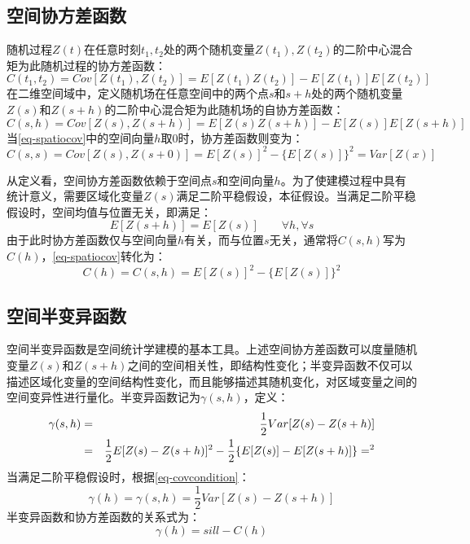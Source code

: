 \subsection{空间协方差函数}
随机过程$Z(t)$在任意时刻$t_1,t_2$处的两个随机变量$Z(t_1),Z(t_2)$的二阶中心混合矩为此随机过程的协方差函数：
\begin{equation}
    C(t_1,t_2) = Cov\left[ Z(t_1),Z(t_2) \right] = E\left[ Z(t_1)Z(t_2) \right] - E\left[ Z(t_1) \right] E\left[ Z(t_2) \right]
    \label{eq-temporalcov}
\end{equation}
在二维空间域中，定义随机场在任意空间中的两个点$s$和$s+h$处的两个随机变量$Z(s)$和$Z(s+h)$的二阶中心混合矩为此随机场的自协方差函数：
\begin{equation}
    C(s,h) = Cov\left[ Z(s),Z(s+h) \right] = E\left[ Z(s)Z(s+h) \right]-E\left[ Z(s) \right] E\left[ Z(s+h) \right]
    \label{eq-spatiocov}
\end{equation}
当\cref{eq-spatiocov}中的空间向量$h$取0时，协方差函数则变为：
\begin{equation}
    C(s,s) = Cov\left[ Z(s), Z(s+0) \right] = E\left[ Z(s) \right]^2 - \{ E\left[ Z(s) \right] \}^2 = Var\left[ Z(x) \right]
    \label{eq-spatiocovsimplize}
\end{equation}

从定义看，空间协方差函数依赖于空间点$s$和空间向量$h$。为了使建模过程中具有统计意义，需要区域化变量$Z(s)$满足二阶平稳假设，本征假设。当满足二阶平稳假设时，空间均值与位置无关，即满足：
\begin{equation}
    E[Z(s+h)] = E[Z(s)] \qquad \forall h,\forall s
    \label{eq-covcondition}
\end{equation}
由于此时协方差函数仅与空间向量$h$有关，而与位置$s$无关，通常将$C(s,h)$写为$C(h)$，\cref{eq-spatiocov}转化为：
\begin{equation}
    C(h)=C(s,h) = E[Z(s)]^2 - \{ E[Z(s)] \}^2
    \label{eq-conditionalcov}
\end{equation}

\subsection{空间半变异函数}
空间半变异函数是空间统计学建模的基本工具。上述\textcolor[rgb]{1,0,0}{空间协方差函数可以度量随机变量$Z(s)$和$Z(s+h)$之间的空间相关性，即结构性变化}；半变异函数不仅可以描述区域化变量的空间结构性变化，而且能够描述其随机变化，对区域变量之间的空间变异性进行量化。半变异函数记为$\gamma(s,h)$，定义：
\begin{eqnarray}
    \gamma(s,h) &=&\dfrac{1}{2}Var[Z(s)-Z(s+h)] \notag \\
    &=& \dfrac{1}{2}E[Z(s)-Z(s+h)]^2 - \dfrac{1}{2}\{ E[Z(s)] - E[Z(s+h)] \}=^2 
    \label{eq-gammapre}
\end{eqnarray}
当满足二阶平稳假设时，根据\cref{eq-covcondition}：
\begin{equation}
    \gamma(h) = \gamma(s,h) = \dfrac{1}{2}Var[Z(s) - Z(s+h)]
    \label{eq-gamma}
\end{equation}
半变异函数和协方差函数的关系式为：
\begin{equation}
    \gamma(h) = sill-C(h)
    \label{eq-gammacov}
\end{equation}

